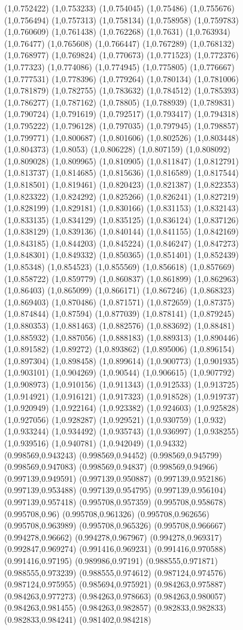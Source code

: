 \documentclass[conference]{IEEEtran}
\begin{document}
\begin{figure}[t]
(1,0.752422) (1,0.753233) (1,0.754045) (1,0.75486) (1,0.755676) (1,0.756494) (1,0.757313) (1,0.758134) (1,0.758958) (1,0.759783) (1,0.760609) (1,0.761438) (1,0.762268) (1,0.7631) (1,0.763934) (1,0.76477) (1,0.765608) (1,0.766447) (1,0.767289) (1,0.768132) (1,0.768977) (1,0.769824) (1,0.770673) (1,0.771523) (1,0.772376) (1,0.77323) (1,0.774086) (1,0.774945) (1,0.775805) (1,0.776667) (1,0.777531) (1,0.778396) (1,0.779264) (1,0.780134) (1,0.781006) (1,0.781879) (1,0.782755) (1,0.783632) (1,0.784512) (1,0.785393) (1,0.786277) (1,0.787162) (1,0.78805) (1,0.788939) (1,0.789831) (1,0.790724) (1,0.791619) (1,0.792517) (1,0.793417) (1,0.794318) (1,0.795222) (1,0.796128) (1,0.797035) (1,0.797945) (1,0.798857) (1,0.799771) (1,0.800687) (1,0.801606) (1,0.802526) (1,0.803448) (1,0.804373) (1,0.8053) (1,0.806228) (1,0.807159) (1,0.808092) (1,0.809028) (1,0.809965) (1,0.810905) (1,0.811847) (1,0.812791) (1,0.813737) (1,0.814685) (1,0.815636) (1,0.816589) (1,0.817544) (1,0.818501) (1,0.819461) (1,0.820423) (1,0.821387) (1,0.822353) (1,0.823322) (1,0.824292) (1,0.825266) (1,0.826241) (1,0.827219) (1,0.828199) (1,0.829181) (1,0.830166) (1,0.831153) (1,0.832143) (1,0.833135) (1,0.834129) (1,0.835125) (1,0.836124) (1,0.837126) (1,0.838129) (1,0.839136) (1,0.840144) (1,0.841155) (1,0.842169) (1,0.843185) (1,0.844203) (1,0.845224) (1,0.846247) (1,0.847273) (1,0.848301) (1,0.849332) (1,0.850365) (1,0.851401) (1,0.852439) (1,0.85348) (1,0.854523) (1,0.855569) (1,0.856618) (1,0.857669) (1,0.858722) (1,0.859779) (1,0.860837) (1,0.861899) (1,0.862963) (1,0.86403) (1,0.865099) (1,0.866171) (1,0.867246) (1,0.868323) (1,0.869403) (1,0.870486) (1,0.871571) (1,0.872659) (1,0.87375) (1,0.874844) (1,0.87594) (1,0.877039) (1,0.878141) (1,0.879245) (1,0.880353) (1,0.881463) (1,0.882576) (1,0.883692) (1,0.88481) (1,0.885932) (1,0.887056) (1,0.888183) (1,0.889313) (1,0.890446) (1,0.891582) (1,0.89272) (1,0.893862) (1,0.895006) (1,0.896154) (1,0.897304) (1,0.898458) (1,0.899614) (1,0.900773) (1,0.901935) (1,0.903101) (1,0.904269) (1,0.90544) (1,0.906615) (1,0.907792) (1,0.908973) (1,0.910156) (1,0.911343) (1,0.912533) (1,0.913725) (1,0.914921) (1,0.916121) (1,0.917323) (1,0.918528) (1,0.919737) (1,0.920949) (1,0.922164) (1,0.923382) (1,0.924603) (1,0.925828) (1,0.927056) (1,0.928287) (1,0.929521) (1,0.930759) (1,0.932) (1,0.933244) (1,0.934492) (1,0.935743) (1,0.936997) (1,0.938255) (1,0.939516) (1,0.940781) (1,0.942049) (1,0.94332) (0.998569,0.943243) (0.998569,0.94452) (0.998569,0.945799) (0.998569,0.947083) (0.998569,0.94837) (0.998569,0.94966) (0.997139,0.949591) (0.997139,0.950887) (0.997139,0.952186) (0.997139,0.953488) (0.997139,0.954795) (0.997139,0.956104) (0.997139,0.957418) (0.995708,0.957359) (0.995708,0.958678) (0.995708,0.96) (0.995708,0.961326) (0.995708,0.962656) (0.995708,0.963989) (0.995708,0.965326) (0.995708,0.966667) (0.994278,0.96662) (0.994278,0.967967) (0.994278,0.969317) (0.992847,0.969274) (0.991416,0.969231) (0.991416,0.970588) (0.991416,0.97195) (0.989986,0.97191) (0.988555,0.971871) (0.988555,0.973239) (0.988555,0.974612) (0.987124,0.974576) (0.987124,0.975955) (0.985694,0.975921) (0.984263,0.975887) (0.984263,0.977273) (0.984263,0.978663) (0.984263,0.980057) (0.984263,0.981455) (0.984263,0.982857) (0.982833,0.982833) (0.982833,0.984241) (0.981402,0.984218) 
\end{figure}
\end{document}
